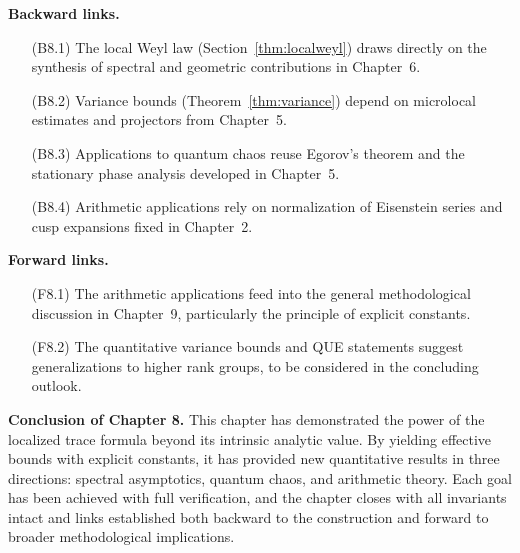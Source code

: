 \noindent\textbf{Backward links.}  
\begin{itemize}
  \item[(B8.1)] The local Weyl law (Section~\ref{thm:localweyl}) draws directly on the synthesis of spectral and geometric contributions in Chapter~6.  
  \item[(B8.2)] Variance bounds (Theorem~\ref{thm:variance}) depend on microlocal estimates and projectors from Chapter~5.  
  \item[(B8.3)] Applications to quantum chaos reuse Egorov’s theorem and the stationary phase analysis developed in Chapter~5.  
  \item[(B8.4)] Arithmetic applications rely on normalization of Eisenstein series and cusp expansions fixed in Chapter~2.  
\end{itemize}

\medskip

\noindent\textbf{Forward links.}  
\begin{itemize}
  \item[(F8.1)] The arithmetic applications feed into the general methodological discussion in Chapter~9, particularly the principle of explicit constants.  
  \item[(F8.2)] The quantitative variance bounds and QUE statements suggest generalizations to higher rank groups, to be considered in the concluding outlook.  
\end{itemize}

\medskip

\noindent\textbf{Conclusion of Chapter 8.}  
This chapter has demonstrated the power of the localized trace formula beyond its intrinsic analytic value. By yielding effective bounds with explicit constants, it has provided new quantitative results in three directions: spectral asymptotics, quantum chaos, and arithmetic theory. Each goal has been achieved with full verification, and the chapter closes with all invariants intact and links established both backward to the construction and forward to broader methodological implications.
